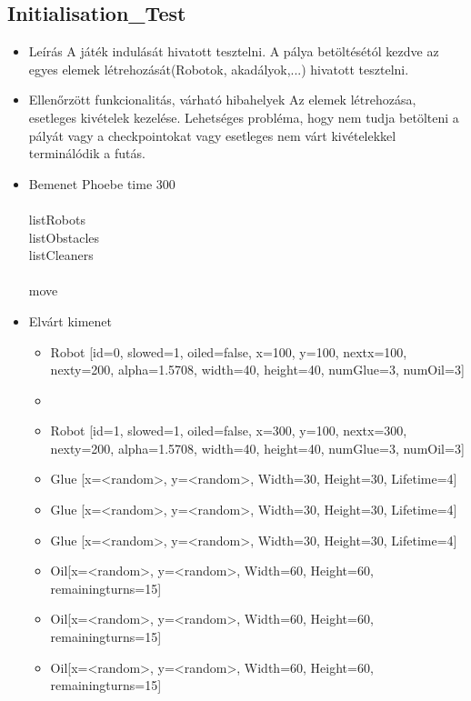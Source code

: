 \subsection{Initialisation\_Test}
\begin{itemize}
\item Leírás\newline
A játék indulását hivatott tesztelni. A pálya betöltésétól kezdve az egyes elemek létrehozását(Robotok, akadályok,...) hivatott tesztelni.
\item Ellenőrzött funkcionalitás, várható hibahelyek
Az elemek létrehozása, esetleges kivételek kezelése. Lehetséges probléma, hogy nem tudja betölteni a pályát vagy a checkpointokat vagy esetleges nem várt kivételekkel terminálódik a futás.
\item Bemenet\newline
Phoebe time 300\\
\\
listRobots\\
listObstacles\\
listCleaners\\
\\
move\\
\item Elvárt kimenet\newline
\begin{itemize}

\item Robot [id=0, slowed=1, oiled=false, x=100, y=100, nextx=100, nexty=200, alpha=1.5708, width=40, height=40, numGlue=3, numOil=3]
\item \item Robot [id=1, slowed=1, oiled=false, x=300, y=100, nextx=300, nexty=200, alpha=1.5708, width=40, height=40, numGlue=3, numOil=3]
\item Glue [x=<random>, y=<random>, Width=30, Height=30, Lifetime=4]
\item Glue [x=<random>, y=<random>, Width=30, Height=30, Lifetime=4]
\item Glue [x=<random>, y=<random>, Width=30, Height=30, Lifetime=4]
\item Oil[x=<random>, y=<random>, Width=60, Height=60, remainingturns=15]
\item Oil[x=<random>, y=<random>, Width=60, Height=60, remainingturns=15]
\item Oil[x=<random>, y=<random>, Width=60, Height=60, remainingturns=15]

\end{itemize}
\end{itemize}
\pagebreak

